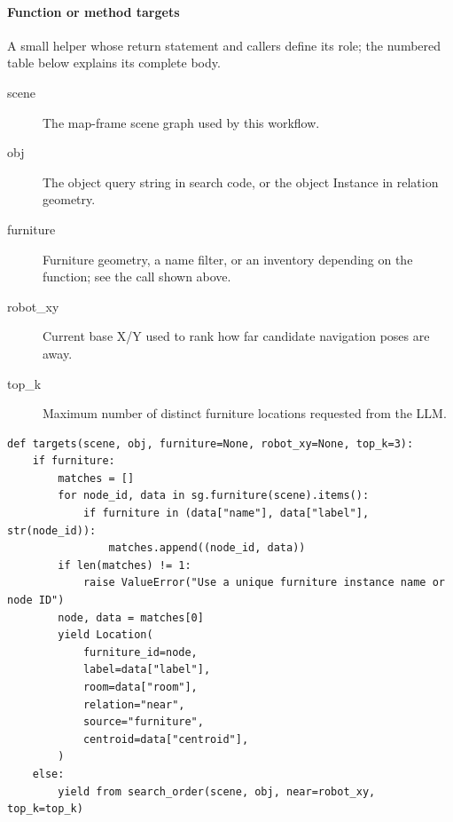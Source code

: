 \documentclass[11pt,a4paper]{book}
\begin{document}
\paragraph{Function or method targets}
A small helper whose return statement and callers define its role; the numbered table below explains its complete body.

\begin{description}
\item[scene] The map-frame scene graph used by this workflow.
\item[obj] The object query string in search code, or the object Instance in relation geometry.
\item[furniture] Furniture geometry, a name filter, or an inventory depending on the function; see the call shown above.
\item[robot\_xy] Current base X/Y used to rank how far candidate navigation poses are away.
\item[top\_k] Maximum number of distinct furniture locations requested from the LLM.
\end{description}

\begin{lstlisting}[firstnumber=19]
def targets(scene, obj, furniture=None, robot_xy=None, top_k=3):
    if furniture:
        matches = []
        for node_id, data in sg.furniture(scene).items():
            if furniture in (data["name"], data["label"], str(node_id)):
                matches.append((node_id, data))
        if len(matches) != 1:
            raise ValueError("Use a unique furniture instance name or node ID")
        node, data = matches[0]
        yield Location(
            furniture_id=node,
            label=data["label"],
            room=data["room"],
            relation="near",
            source="furniture",
            centroid=data["centroid"],
        )
    else:
        yield from search_order(scene, obj, near=robot_xy, top_k=top_k)


\end{lstlisting}
\end{document}
